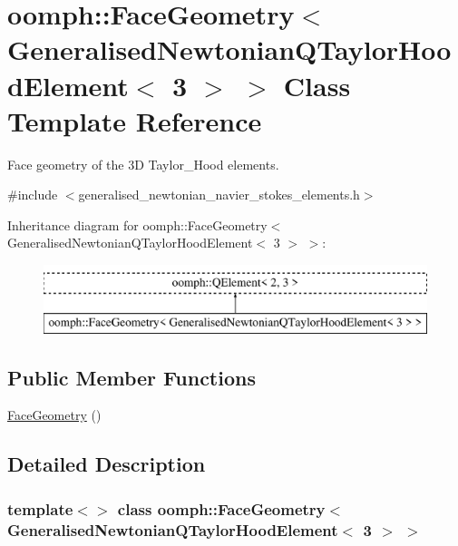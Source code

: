 \hypertarget{classoomph_1_1FaceGeometry_3_01GeneralisedNewtonianQTaylorHoodElement_3_013_01_4_01_4}{}\section{oomph\+:\+:Face\+Geometry$<$ Generalised\+Newtonian\+Q\+Taylor\+Hood\+Element$<$ 3 $>$ $>$ Class Template Reference}
\label{classoomph_1_1FaceGeometry_3_01GeneralisedNewtonianQTaylorHoodElement_3_013_01_4_01_4}


Face geometry of the 3D Taylor\+\_\+\+Hood elements.  




{\ttfamily \#include $<$generalised\+\_\+newtonian\+\_\+navier\+\_\+stokes\+\_\+elements.\+h$>$}

Inheritance diagram for oomph\+:\+:Face\+Geometry$<$ Generalised\+Newtonian\+Q\+Taylor\+Hood\+Element$<$ 3 $>$ $>$\+:\begin{figure}[H]
\begin{center}
\leavevmode
\includegraphics[height=2.000000cm]{classoomph_1_1FaceGeometry_3_01GeneralisedNewtonianQTaylorHoodElement_3_013_01_4_01_4}
\end{center}
\end{figure}
\subsection*{Public Member Functions}
\begin{DoxyCompactItemize}
\item 
\hyperlink{classoomph_1_1FaceGeometry_3_01GeneralisedNewtonianQTaylorHoodElement_3_013_01_4_01_4_ae9e6562396c778f3f2ab65bba85d50ad}{Face\+Geometry} ()
\end{DoxyCompactItemize}


\subsection{Detailed Description}
\subsubsection*{template$<$$>$\newline
class oomph\+::\+Face\+Geometry$<$ Generalised\+Newtonian\+Q\+Taylor\+Hood\+Element$<$ 3 $>$ $>$}

